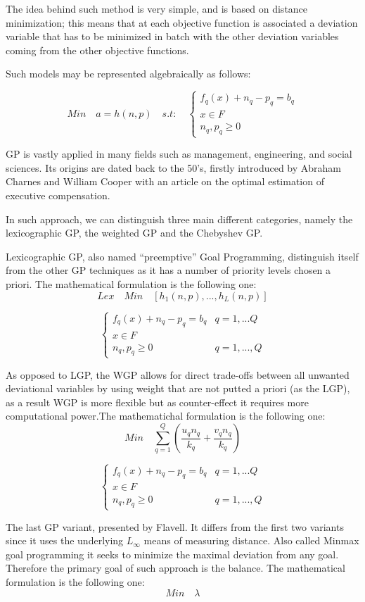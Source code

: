 \documentclass{article}
\begin{document}
The idea behind such method is very simple, and is based on distance minimization; this means that at each objective function is associated a deviation variable that has to be minimized in batch with the other deviation variables coming from the other objective functions.

Such models may be represented algebraically as follows:


\[
Min \quad a=h(n,p) \quad s.t: \quad
\begin{cases}
f_q(x)+n_q-p_q=b_q \\
x\in F \\
n_q,p_q\geq 0
\end{cases}
\]

GP is vastly applied in many fields\cite{tamiz_goal_1998} such as management, engineering, and social sciences. Its origins are dated back to the 50's, firstly introduced by Abraham Charnes and William Cooper\cite{charnes_optimal_1955} with an article on the optimal estimation of executive compensation.

In such approach, we can distinguish three main different categories, namely the lexicographic GP, the weighted GP and the Chebyshev GP.

Lexicographic GP, also named “preemptive” Goal Programming, distinguish itself from the other GP techniques as it has a number of priority levels chosen a priori. The mathematical formulation is the following one:
\[
Lex \quad Min \quad [h_1(n,p),...,h_L(n,p)]
\]

\[
\begin{cases}
f_q(x)+n_q-p_q=b_q & q=1,...Q
\\
x\in F
\\
n_q,p_q\geq0 & q=1,...,Q
\end{cases}
\]

As opposed to LGP, the WGP allows for direct trade-offs between all unwanted deviational variables by using weight that are not putted a priori (as the LGP), as a result WGP is more flexible but as counter-effect it requires more computational power.The mathematichal formulation is the following one:
\[
Min \quad \sum_{q=1}^{Q}(\frac{u_q n_q}{k_q}+\frac{v_q n_q}{k_q})
\]

\[
\begin{cases}
f_q(x)+n_q-p_q=b_q & q=1,...Q
\\
x\in F
\\
n_q,p_q\geq0 & q=1,...,Q
\end{cases}
\]

The last GP variant, presented by Flavell. It differs from the first two variants since it uses the underlying $ L_\infty $ means of measuring distance. Also called Minmax goal programming it seeks to minimize the maximal deviation from any goal. Therefore the primary goal of such approach is the balance. The mathematical formulation is the following one:
\[
Min \quad \lambda
\]
\end{document}
